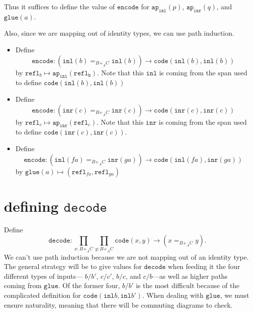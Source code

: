 \documentclass[12pt]{amsart}
\newcommand{\from}{\colon}
\newcommand{\type}[1]{\mathtt{#1}}
\newcommand{\ap}{\type{ap}}
\newcommand{\inl}{\type{inl}}
\newcommand{\inr}{\type{inr}}
\newcommand{\glue}{\type{glue}}
\newcommand{\refl}{\type{refl}}
\newcommand{\code}{\type{code}}
\newcommand{\encode}{\type{encode}}
\newcommand{\decode}{\type{decode}}
\theoremstyle{remark}
\theoremstyle{definition}
\begin{document}
Thus it suffices to define the value of $ \encode $ for $ \ap_{\inl}(p) $, $ \ap_{\inr}(q) $, and $ \glue (a) $.  

Also, since we are mapping out of identity types, we can use path induction.

\begin{itemize}
	\item Define 
	\[
		\encode \from (\inl (b) =_{B+_AC} \inl (b)) \to \code (\inl(b),\inl(b))
	\] 
	by $ \refl_b \mapsto \ap_\inl (\type{refl_b})  $. Note that this $ \inl $ is coming from the span used to define $ \code(\inl(b),\inl(b)) $
	\item Define 
	\[
		\encode \from (\inr (c) =_{B+_AC} \inr (c)) \to \code (\inr(c),\inr(c))
	\] 
	by $ \refl_c \mapsto \ap_\inr (\refl_c)  $. Note that this $ \inr $ is coming from the span used to define $ \code(\inr(c),\inr(c)) $.
	\item Define 
	\[
		\encode \from (\inl (fa) =_{B+_AC} \inr (ga)) \to \code (\inl(fa),\inr(ga))
	\]
	by $ \glue (a) \mapsto ( \refl_{fa} , \refl_{ga}) $
\end{itemize}

\section{defining $\decode$}

Define 
\[
	\decode : 
	\prod_{x : B+_AC} \prod_{y : B+_AC} 
	\code (x,y) \to (x=_{B+_AC} y).
\]
We can't use path induction because we are not mapping out of an identity type. The general strategy will be to give values for $ \decode $ when feeding it the four different types of inputs--- $ b/b' $, $ c/c' $, $ b/c $, and $ c/b $---as well as higher paths coming from $ \glue $.  Of the former four, $ b/b' $ is the most difficult because of the complicated definition for $ \code (\inl b , \inl b') $.  When dealing with $ \glue $, we must ensure naturality, meaning that there will be commuting diagrams to check.
\end{document}
